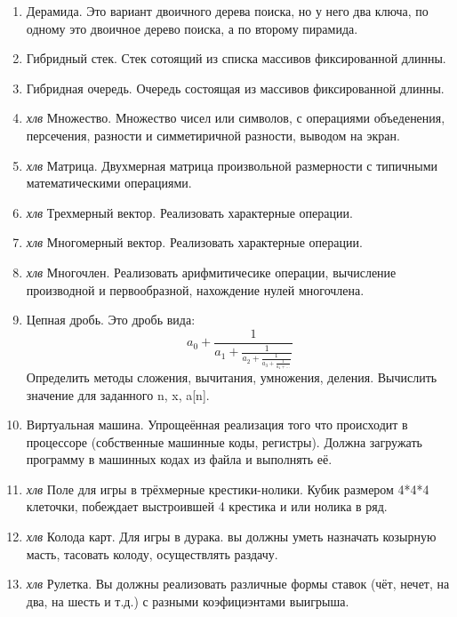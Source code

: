 \documentclass[12pt, oneside]{article}
\begin{document}
\begin{enumerate}
  \item Дерамида. Это вариант двоичного дерева поиска, но у него два ключа, по одному это двоичное дерево
        поиска, а по второму пирамида.
  \item Гибридный стек. Стек сотоящий из списка массивов фиксированной длинны.
  \item Гибридная очередь. Очередь состоящая из массивов фиксированной длинны.
  \item \textit{хлв} Множество. Множество чисел или символов, с операциями объеденения, персечения, разности и симметиричной разности, 
        выводом на экран.
  \item \textit{хлв} Матрица. Двухмерная матрица произвольной размерности с типичными математическими операциями.
  \item \textit{хлв} Трехмерный вектор. Реализовать характерные операции.
  \item \textit{хлв} Многомерный вектор. Реализовать характерные операции.
  \item \textit{хлв} Многочлен. Реализовать арифмитичесике операции, вычисление производной и первообразной, нахождение нулей многочлена.
  \item Цепная дробь. Это дробь вида:
  \begin{equation}
   a_0+\frac{1}{a_1+\frac{1}{a_2+\frac{1}{a_3+\frac{1}{a_4+...}}}}
  \end{equation}
        Определить методы сложения, вычитания, умножения, деления. Вычислить значение для заданного n, x, a[n].
  \item Виртуальная машина. Упрощеённая реализация того что происходит в процессоре (собственные машинные коды, регистры). 
        Должна загружать программу в машинных кодах из файла и выполнять её.
  \item \textit{хлв} Поле для игры в трёхмерные крестики-нолики. Кубик размером 4*4*4 клеточки, побеждает выстроившей 4 крестика и или нолика в ряд.
  \item \textit{хлв} Колода карт. Для игры в дурака. вы должны уметь назначать козырную масть, тасовать колоду, осуществлять раздачу.
  \item \textit{хлв} Рулетка. Вы должны реализовать различные формы ставок (чёт, нечет, на два, на шесть и т.д.) с разными коэфициэнтами выигрыша.
 \end{enumerate}
\end{document}
